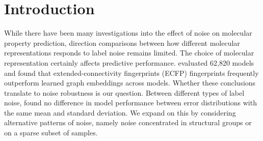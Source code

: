 \section{Introduction}


While there have been many investigations into the effect of noise on molecular property prediction, direction comparisons between how different molecular representations responds to label noise remains limited. The choice of molecular representation certainly affects predictive performance. \cite{Deng2023} evaluated 62,820 models and found that extended-connectivity fingerprints (ECFP) fingerprints frequently outperform learned graph embeddings across models. Whether these conclusions translate to noise robustness is our question. Between different types of label noise, \cite{Heid2023} found no difference in model performance between error distributions with the same mean and standard deviation. We expand on this by considering alternative patterns of noise, namely noise concentrated in structural groups or on a sparse subset of samples.

